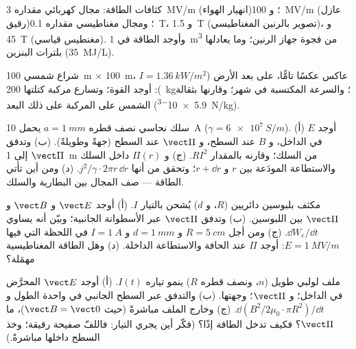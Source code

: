 \begin{exercise}[$\star$]\label{exo:b2:poynting-vector:3}
كثافات الطاقة: مجال كهربائي مقداره \qty{3}{MV/m} (انهيار الهواء)؛
و \qty{100}{MV/m} (عازل رقيق)؛ ومجال مغناطيسي مقداره \qty{0.1}{T}،
و \qty{1.5}{T} (تصوير بالرنين المغناطيسي)، و \qty{45}{T} (مغنطيس قياسي). وأوجد الطاقة في \qty{1}{m^3} من
فجوة جهاز الرنين؛ وما يعادلها بلترات البنزين (\qty{35}{MJ/L}).
\end{exercise}

\begin{exercise}[$\star$]\label{exo:b2:poynting-vector:4}
شراع شمسي \qty{100}{m} $\times$ \qty{100}{m}، عاكس عكسًا تامًّا، على
بعد الأرض ($I = \qty{1.36}{kW/m^2}$): أوجد القوة؛ وتسارع مركبة
كتلتها \qty{200}{kg}؛ والسرعة المكتسبة في شهر؛ وقارنها بثقالة الشمس
على المركبة على ذلك البعد (\qty{5.9e-3}{N/kg}).
\end{exercise}

\begin{exercise}[$\star\star$]\label{exo:b2:poynting-vector:5}
سلك نحاسي نصف قطره $a = \qty{1}{mm}$ يحمل \qty{10}{A} ($\gamma =
\qty{6e7}{S/m}$). (أ) أوجد $E$ في الداخل، و $B$ عند السطح، و $\vect\Pi$ عند
السطح (جهةً وطويلةً). (ب) وتدفق $\vect\Pi$ إلى \qty{1}{m}
من السلك؛ وقارنه بالمقدار $RI^2$. (ج) و $\Pi(r)$ داخل السلك والاستطاعة
المودَعة بين $r$ و $r + \dd r$؛ وتحقق من أنها $j^2/\gamma\cdot2\pi r\,\dd r$.
(د) ومن أين تأتي الطاقة --- صف المجال بين
البطارية والسلك.
\end{exercise}

\begin{exercise}[$\star\star$]\label{exo:b2:poynting-vector:6}
مكثف بلبوسين دائريين ($R$، و $d$) يُشحن بالتيار $I$. (أ) أوجد $\vect E$ و $\vect B$
و $\vect\Pi$ بين اللبوسين. (ب) وتدفق $\vect\Pi$ عبر الأسطوانة
الجانبية؛ وبيّن أنه يساوي $\dd W_e/\dd t$. (ج) ومن أجل $R = \qty{5}{cm}$ و $d =
\qty{1}{mm}$ و $I = \qty{1}{A}$ في اللحظة التي فيها $E = \qty{1}{MV/m}$: أوجد $\Pi$ عند
الحافة والاستطاعة الداخلة. (د) وهل الطاقة المغناطيسية مهمَلة؟
\end{exercise}

\begin{exercise}[$\star\star$]\label{exo:b2:poynting-vector:7}
ملف لولبي طويل ($n$، ونصف قطره $R$) ينمو تياره $I(t)$. (أ)
أوجد $\vect E$ المحرَّض في الداخل؛ و $\vect\Pi$؛ وجهتها. (ب) والتدفق عبر
السطح الجانبي في واحدة الطول و $\dd(B^2/2\mu_0\cdot\pi R^2)/\dd t$. (ج)
وخارج الملف مباشرةً (حيث $\vect B = \vect 0$)، ما $\vect\Pi$؟
فكيف تدخل الطاقة إذًا؟ (فكّر أين يجري التيار:
فاللفّ صفيحة رقيقة؛ وخذ السطح داخلها مباشرةً.)
\end{exercise}

